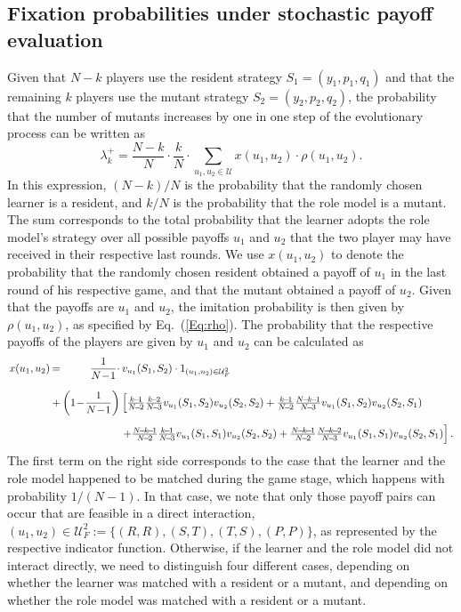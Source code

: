 \documentclass[11pt]{article}
\theoremstyle{plainCl1}
\theoremstyle{plainCl2}
\begin{document}
\subsection{Fixation probabilities under stochastic payoff evaluation}
Given that $N\!-\!k$ players use the resident strategy $S_1\!=\!(y_1,p_1,q_1)$ and that the remaining $k$ players use the mutant strategy $S_2\!=\!(y_2,p_2,q_2)$, the probability that the number of mutants increases by one in one step of the evolutionary process can be written as
\begin{equation}
\lambda^+_k=\frac{N\!-\!k}{N}\cdot \frac{k}{N}\cdot \sum_{u_1,u_2\in\mathcal{U}} x(u_1,u_2)\cdot \rho(u_1,u_2).
\end{equation}
In this expression, $(N\!-\!k)/N$ is the probability that the randomly chosen learner is a resident, and $k/N$ is the probability that the role model is a mutant. The sum corresponds to the total probability that the learner adopts the role model's strategy over all possible payoffs $u_1$ and $u_2$ that the two player may have received in their respective last rounds. We use $x(u_1,u_2)$ to denote the probability that the randomly chosen resident obtained a payoff of $u_1$ in the last round of his respective game, and that the mutant obtained a payoff of $u_2$. Given that the payoffs are $u_1$ and $u_2$, the imitation probability is then given by $\rho(u_1,u_2)$, as specified by Eq.~(\ref{Eq:rho}). The probability that the respective payoffs of the players are given by $u_1$ and $u_2$ can be calculated as
\begin{equation}
\setlength{\arraycolsep}{1pt}
\begin{array}{llrl}
x(u_1,u_2)	 &=&\displaystyle \frac{1}{N\!-\!1}\cdot  &v_{u_1}(S_1,S_2)\cdot 1_{(u_1,u_2)\in \mathcal{U}^2_F}\\[0.5cm]
&+	
&\displaystyle \left(1\!-\!\frac{1}{N\!-\!1}\right)  
&\left[ \frac{k\!-\!1}{N\!-\!2}\frac{k\!-\!2}{N\!-\!3} v_{u_1}(S_1,S_2) v_{u_2}(S_2,S_2) + 
 \frac{k\!-\!1}{N\!-\!2}\frac{N\!-\!k\!-\!1}{N\!-\!3} v_{u_1}(S_1,S_2) v_{u_2}(S_2,S_1)\right.\\[0.5cm]
&&&\left. +\frac{N\!-\!k\!-\!1}{N\!-\!2}\frac{k\!-\!1}{N\!-\!3} v_{u_1}(S_1,S_1) v_{u_2}(S_2,S_2) + 
 \frac{N\!-\!k\!-\!1}{N\!-\!2}\frac{N\!-\!k\!-\!2}{N\!-\!3} v_{u_1}(S_1,S_1) v_{u_2}(S_2,S_1)\right].
\end{array}
\end{equation}
The first term on the right side corresponds to the case that the learner and the role model happened to be matched during the game stage, which happens with probability $1/(N\!-\!1)$. In that case, we note that only those payoff pairs can occur that are feasible in a direct interaction, $(u_1,u_2)\in \mathcal{U}^2_F:=\big\{ (R,R), (S,T), (T,S), (P,P) \big\}$, as represented by the respective indicator function. Otherwise, if the learner and the role model did not interact directly, we need to distinguish four different cases, depending on whether the learner was matched with a resident or a mutant, and depending on whether the role model was matched with a resident or a mutant. 
\end{document}
